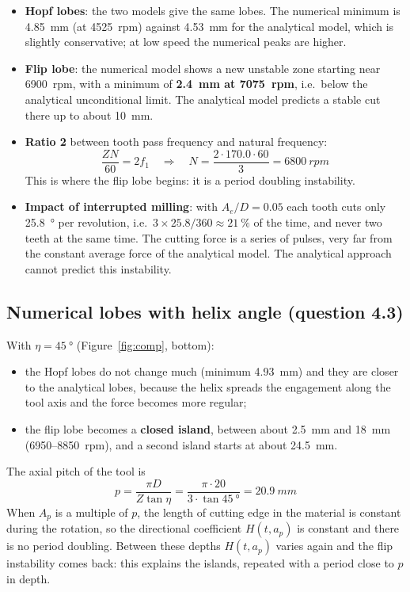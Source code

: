 \documentclass[11pt,a4paper]{article}
\begin{document}
\begin{itemize}
  \item \textbf{Hopf lobes}: the two models give the same lobes. The numerical minimum is
        \SI{4.85}{mm} (at \SI{4525}{rpm}) against \SI{4.53}{mm} for the analytical model,
        which is slightly conservative; at low speed the numerical peaks are higher.
  \item \textbf{Flip lobe}: the numerical model shows a new unstable zone starting near
        \SI{6900}{rpm}, with a minimum of \textbf{\SI{2.4}{mm} at \SI{7075}{rpm}}, i.e.\ below
        the analytical unconditional limit. The analytical model predicts a stable cut there
        up to about \SI{10}{mm}.
  \item \textbf{Ratio 2} between tooth pass frequency and natural frequency:
        \begin{equation}
        \frac{ZN}{60}=2f_1\quad\Rightarrow\quad N=\frac{2\cdot 170.0\cdot 60}{3}=\SI{6800}{rpm}
        \end{equation}
        This is where the flip lobe begins: it is a period doubling instability.
  \item \textbf{Impact of interrupted milling}: with $A_e/D=0.05$ each tooth cuts only
        \SI{25.8}{\degree} per revolution, i.e.\ $3\times25.8/360\approx\SI{21}{\percent}$ of
        the time, and never two teeth at the same time. The cutting force is a series of
        pulses, very far from the constant average force of the analytical model. The
        analytical approach cannot predict this instability.
\end{itemize}

\subsection{Numerical lobes with helix angle (question 4.3)}
With $\eta=\SI{45}{\degree}$ (Figure~\ref{fig:comp}, bottom):
\begin{itemize}
  \item the Hopf lobes do not change much (minimum \SI{4.93}{mm}) and they are closer to the
        analytical lobes, because the helix spreads the engagement along the tool axis and
        the force becomes more regular;
  \item the flip lobe becomes a \textbf{closed island}, between about \SI{2.5}{mm} and
        \SI{18}{mm} (\numrange{6950}{8850}~rpm), and a second island starts at about
        \SI{24.5}{mm}.
\end{itemize}
The axial pitch of the tool is
\begin{equation}
p=\frac{\pi D}{Z\tan\eta}=\frac{\pi\cdot 20}{3\cdot\tan\SI{45}{\degree}}=\SI{20.9}{mm}
\end{equation}
When $A_p$ is a multiple of $p$, the length of cutting edge in the material is constant
during the rotation, so the directional coefficient $H(t,a_p)$ is constant and there is no
period doubling. Between these depths $H(t,a_p)$ varies again and the flip instability comes
back: this explains the islands, repeated with a period close to $p$ in depth.
\end{document}
